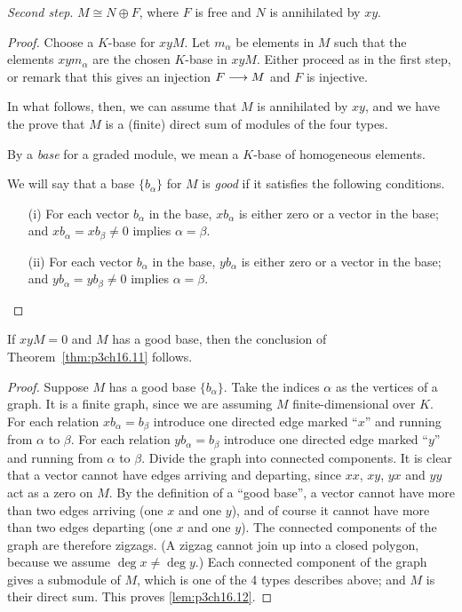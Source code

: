 \documentclass[../main]{subfiles}
\begin{document}
\emph{Second step}. $M \cong N \oplus F$, where $F$ is free and $N$ is annihilated by $xy$.

\begin{proof}
Choose a $K$-base for $x y M$. Let $m_\alpha$ be elements in $M$ such that the elements $x y m_\alpha$ are the chosen $K$-base in $x y M$. Either proceed as in the first step, or remark that this gives an injection $F \overset{}{\longrightarrow} M$ and $F$ is injective.

In what follows, then, we can assume that $M$ is annihilated by $x y$, and we have the prove that $M$ is a (finite) direct sum of modules of the four types.

By a \emph{base} for a graded module, we mean a $K$-base of homogeneous elements. 

We will say that a base $\{b_\alpha\}$ for $M$ is \emph{good} if it satisfies the following conditions. 

\begin{enumerate}
    \item[(i)] For each vector $b_\alpha$ in the base, $x b_\alpha$ is either zero or a vector in the base; and $x b_\alpha = x b_\beta \ne 0$ implies $\alpha = \beta$.
    \item[(ii)] For each vector $b_\alpha$ in the base, $y b_\alpha$ is either zero or a vector in the base; and $y b_\alpha = y b_\beta \ne 0$ implies $\alpha = \beta$. 
\end{enumerate}
\end{proof}

\begin{lemma}
\label{lem:p3ch16.12}
If $x y M = 0$ and $M$ has a good base, then the conclusion of Theorem~\ref{thm:p3ch16.11} follows. 
\end{lemma}

\begin{proof}
Suppose $M$ has a good base $\{b_\alpha\}$. Take the indices $\alpha$ as the vertices of a graph. It is a finite graph, since we are assuming $M$ finite-dimensional over $K$. For each relation $x b_\alpha = b_\beta$ introduce one directed edge marked ``$x$'' and running from $\alpha$ to $\beta$. For each relation $y b_\alpha = b_\beta$ introduce one directed edge marked ``$y$'' and running from $\alpha$ to $\beta$. Divide the graph into connected components. It is clear that a vector cannot have edges arriving and departing, since $x x$, $x y$, $y x$ and $y y$ act as a zero on $M$. By the definition of a ``good base'', a vector cannot have more than two edges arriving (one $x$ and one $y$), and of course it cannot have more than two edges departing (one $x$ and one $y$). The connected components of the graph are therefore zigzags. (A zigzag cannot join up into a closed polygon, because we assume $\deg x \ne \deg y$.) Each connected component of the graph gives a submodule of $M$, which is one of the 4 types describes above; and $M$ is their direct sum. This proves \ref{lem:p3ch16.12}.
\end{proof}
\end{document}
